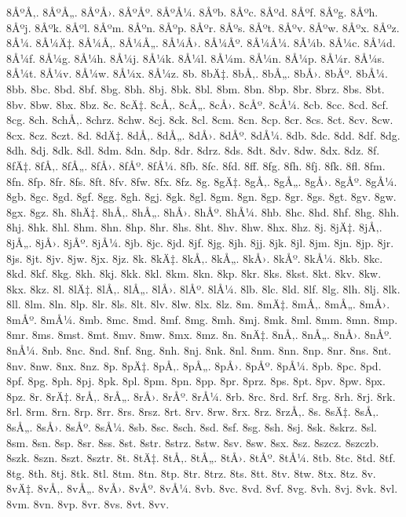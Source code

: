 {8ÅºÅ‚.
8ÅºÅ„.
8ÅºÅ›.
8ÅºÅº.
8ÅºÅ¼.
8Åºb.
8Åºc.
8Åºd.
8Åºf.
8Åºg.
8Åºh.
8Åºj.
8Åºk.
8Åºl.
8Åºm.
8Åºn.
8Åºp.
8Åºr.
8Åºs.
8Åºt.
8Åºv.
8Åºw.
8Åºx.
8Åºz.
8Å¼.
8Å¼Ä‡.
8Å¼Å‚.
8Å¼Å„.
8Å¼Å›.
8Å¼Åº.
8Å¼Å¼.
8Å¼b.
8Å¼c.
8Å¼d.
8Å¼f.
8Å¼g.
8Å¼h.
8Å¼j.
8Å¼k.
8Å¼l.
8Å¼m.
8Å¼n.
8Å¼p.
8Å¼r.
8Å¼s.
8Å¼t.
8Å¼v.
8Å¼w.
8Å¼x.
8Å¼z.
8b.
8bÄ‡.
8bÅ‚.
8bÅ„.
8bÅ›.
8bÅº.
8bÅ¼.
8bb.
8bc.
8bd.
8bf.
8bg.
8bh.
8bj.
8bk.
8bl.
8bm.
8bn.
8bp.
8br.
8brz.
8bs.
8bt.
8bv.
8bw.
8bx.
8bz.
8c.
8cÄ‡.
8cÅ‚.
8cÅ„.
8cÅ›.
8cÅº.
8cÅ¼.
8cb.
8cc.
8cd.
8cf.
8cg.
8ch.
8chÅ‚.
8chrz.
8chw.
8cj.
8ck.
8cl.
8cm.
8cn.
8cp.
8cr.
8cs.
8ct.
8cv.
8cw.
8cx.
8cz.
8czt.
8d.
8dÄ‡.
8dÅ‚.
8dÅ„.
8dÅ›.
8dÅº.
8dÅ¼.
8db.
8dc.
8dd.
8df.
8dg.
8dh.
8dj.
8dk.
8dl.
8dm.
8dn.
8dp.
8dr.
8drz.
8ds.
8dt.
8dv.
8dw.
8dx.
8dz.
8f.
8fÄ‡.
8fÅ‚.
8fÅ„.
8fÅ›.
8fÅº.
8fÅ¼.
8fb.
8fc.
8fd.
8ff.
8fg.
8fh.
8fj.
8fk.
8fl.
8fm.
8fn.
8fp.
8fr.
8fs.
8ft.
8fv.
8fw.
8fx.
8fz.
8g.
8gÄ‡.
8gÅ‚.
8gÅ„.
8gÅ›.
8gÅº.
8gÅ¼.
8gb.
8gc.
8gd.
8gf.
8gg.
8gh.
8gj.
8gk.
8gl.
8gm.
8gn.
8gp.
8gr.
8gs.
8gt.
8gv.
8gw.
8gx.
8gz.
8h.
8hÄ‡.
8hÅ‚.
8hÅ„.
8hÅ›.
8hÅº.
8hÅ¼.
8hb.
8hc.
8hd.
8hf.
8hg.
8hh.
8hj.
8hk.
8hl.
8hm.
8hn.
8hp.
8hr.
8hs.
8ht.
8hv.
8hw.
8hx.
8hz.
8j.
8jÄ‡.
8jÅ‚.
8jÅ„.
8jÅ›.
8jÅº.
8jÅ¼.
8jb.
8jc.
8jd.
8jf.
8jg.
8jh.
8jj.
8jk.
8jl.
8jm.
8jn.
8jp.
8jr.
8js.
8jt.
8jv.
8jw.
8jx.
8jz.
8k.
8kÄ‡.
8kÅ‚.
8kÅ„.
8kÅ›.
8kÅº.
8kÅ¼.
8kb.
8kc.
8kd.
8kf.
8kg.
8kh.
8kj.
8kk.
8kl.
8km.
8kn.
8kp.
8kr.
8ks.
8kst.
8kt.
8kv.
8kw.
8kx.
8kz.
8l.
8lÄ‡.
8lÅ‚.
8lÅ„.
8lÅ›.
8lÅº.
8lÅ¼.
8lb.
8lc.
8ld.
8lf.
8lg.
8lh.
8lj.
8lk.
8ll.
8lm.
8ln.
8lp.
8lr.
8ls.
8lt.
8lv.
8lw.
8lx.
8lz.
8m.
8mÄ‡.
8mÅ‚.
8mÅ„.
8mÅ›.
8mÅº.
8mÅ¼.
8mb.
8mc.
8md.
8mf.
8mg.
8mh.
8mj.
8mk.
8ml.
8mm.
8mn.
8mp.
8mr.
8ms.
8mst.
8mt.
8mv.
8mw.
8mx.
8mz.
8n.
8nÄ‡.
8nÅ‚.
8nÅ„.
8nÅ›.
8nÅº.
8nÅ¼.
8nb.
8nc.
8nd.
8nf.
8ng.
8nh.
8nj.
8nk.
8nl.
8nm.
8nn.
8np.
8nr.
8ns.
8nt.
8nv.
8nw.
8nx.
8nz.
8p.
8pÄ‡.
8pÅ‚.
8pÅ„.
8pÅ›.
8pÅº.
8pÅ¼.
8pb.
8pc.
8pd.
8pf.
8pg.
8ph.
8pj.
8pk.
8pl.
8pm.
8pn.
8pp.
8pr.
8prz.
8ps.
8pt.
8pv.
8pw.
8px.
8pz.
8r.
8rÄ‡.
8rÅ‚.
8rÅ„.
8rÅ›.
8rÅº.
8rÅ¼.
8rb.
8rc.
8rd.
8rf.
8rg.
8rh.
8rj.
8rk.
8rl.
8rm.
8rn.
8rp.
8rr.
8rs.
8rsz.
8rt.
8rv.
8rw.
8rx.
8rz.
8rzÅ‚.
8s.
8sÄ‡.
8sÅ‚.
8sÅ„.
8sÅ›.
8sÅº.
8sÅ¼.
8sb.
8sc.
8sch.
8sd.
8sf.
8sg.
8sh.
8sj.
8sk.
8skrz.
8sl.
8sm.
8sn.
8sp.
8sr.
8ss.
8st.
8str.
8strz.
8stw.
8sv.
8sw.
8sx.
8sz.
8szcz.
8szczb.
8szk.
8szn.
8szt.
8sztr.
8t.
8tÄ‡.
8tÅ‚.
8tÅ„.
8tÅ›.
8tÅº.
8tÅ¼.
8tb.
8tc.
8td.
8tf.
8tg.
8th.
8tj.
8tk.
8tl.
8tm.
8tn.
8tp.
8tr.
8trz.
8ts.
8tt.
8tv.
8tw.
8tx.
8tz.
8v.
8vÄ‡.
8vÅ‚.
8vÅ„.
8vÅ›.
8vÅº.
8vÅ¼.
8vb.
8vc.
8vd.
8vf.
8vg.
8vh.
8vj.
8vk.
8vl.
8vm.
8vn.
8vp.
8vr.
8vs.
8vt.
8vv.
}
